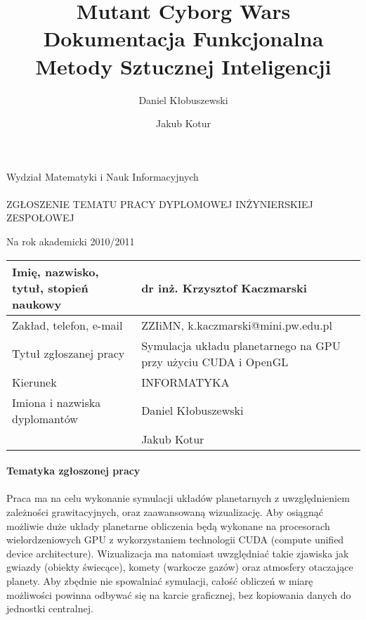 \documentclass[a4paper,titlepage,10pt]{article}
\title{\huge Mutant Cyborg Wars \\\large Dokumentacja Funkcjonalna\\\small Metody Sztucznej Inteligencji }
\author{Daniel Kłobuszewski\and Jakub Kotur}
\begin{document}
	\paragraph{}

	Wydział Matematyki i Nauk Informacyjnych

	\paragraph{}
	\begin{center}
	ZGŁOSZENIE TEMATU PRACY DYPLOMOWEJ INŻYNIERSKIEJ ZESPOŁOWEJ

	Na rok akademicki 2010/2011
	\end{center}

	\begin{tabular}{ | l | p{} | }
	\hline
	Imię, nazwisko, tytuł, stopień naukowy & dr inż. Krzysztof Kaczmarski \\ \hline
	Zakład, telefon, e-mail & ZZIiMN, k.kaczmarski@mini.pw.edu.pl \\\hline
	Tytuł zgłoszanej pracy & Symulacja układu planetarnego na GPU przy użyciu CUDA i OpenGL \\\hline
	Kierunek & INFORMATYKA \\\hline
	Imiona i nazwiska dyplomantów & Daniel Kłobuszewski\\
	& Jakub Kotur \\\hline
	\end{tabular}

	\paragraph{Tematyka zgłoszonej pracy}

	\paragraph{}

	Praca ma na celu wykonanie symulacji układów planetarnych z uwzględnieniem zależności grawitacyjnych, oraz zaawansowaną wizualizację. Aby osiągnąć możliwie duże układy planetarne obliczenia będą wykonane na procesorach wielordzeniowych GPU z wykorzystaniem technologii CUDA (compute unified device architecture). Wizualizacja ma natomiast uwzględniać takie zjawiska jak gwiazdy (obiekty świecące), komety (warkocze gazów) oraz atmosfery otaczające planety. Aby zbędnie nie spowalniać symulacji, całość obliczeń w miarę możliwości powinna odbywać się na karcie graficznej, bez kopiowania danych do jednostki centralnej.
\end{document}
